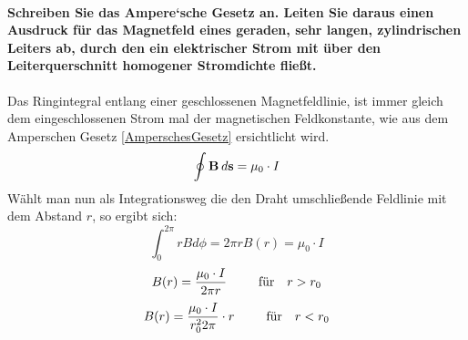 \documentclass[a4paper, 11pt, parskip=half]{scrartcl}
\begin{document}
\paragraph{Schreiben Sie das Ampere‘sche Gesetz an. Leiten Sie daraus einen Ausdruck für das
Magnetfeld eines geraden, sehr langen, zylindrischen Leiters ab, durch den ein elektrischer Strom
mit über den Leiterquerschnitt homogener Stromdichte fließt.}
Das Ringintegral entlang einer geschlossenen Magnetfeldlinie, ist immer gleich dem eingeschlossenen Strom mal der magnetischen Feldkonstante,
wie aus dem Amperschen Gesetz \ref{AmperschesGesetz} ersichtlicht wird.  
\begin{equation}
    \oint \textbf{B} \hspace{0.2em} d\textbf{s} = \mu_0\cdot I
\end{equation}
Wählt man nun als Integrationsweg die den Draht umschließende Feldlinie mit dem Abstand $r$, so ergibt sich:
\begin{equation}
    \int_{0}^{2\pi} rBd\phi = 2 \pi r B(r) = \mu_0\cdot I
\end{equation}
\begin{equation}
    B(r) = \frac{\mu_0\cdot I}{2 \pi r} \hspace{2.5em} \text{für} \hspace{1em} r > r_0
\end{equation}
\begin{equation}
    B(r) = \frac{\mu_0\cdot I}{r_{0}^{2} 2 \pi} \cdot r  \hspace{2.5em} \text{für} \hspace{1em} r < r_0
\end{equation}
\end{document}
